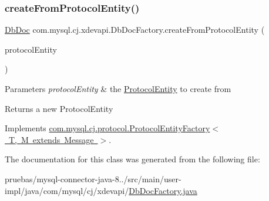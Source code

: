 \subsubsection{\texorpdfstring{create\+From\+Protocol\+Entity()}{createFromProtocolEntity()}}
{\footnotesize\ttfamily \mbox{\hyperlink{interfacecom_1_1mysql_1_1cj_1_1xdevapi_1_1_db_doc}{Db\+Doc}} com.\+mysql.\+cj.\+xdevapi.\+Db\+Doc\+Factory.\+create\+From\+Protocol\+Entity (\begin{DoxyParamCaption}\item[{\mbox{\hyperlink{interfacecom_1_1mysql_1_1cj_1_1protocol_1_1_protocol_entity}{Protocol\+Entity}}}]{protocol\+Entity }\end{DoxyParamCaption})}


\begin{DoxyParams}{Parameters}
{\em protocol\+Entity} & the \mbox{\hyperlink{}{Protocol\+Entity}} to create from \\
\hline
\end{DoxyParams}
\begin{DoxyReturn}{Returns}
a new Protocol\+Entity 
\end{DoxyReturn}


Implements \mbox{\hyperlink{interfacecom_1_1mysql_1_1cj_1_1protocol_1_1_protocol_entity_factory_a282b14fecc86c7202cd9361333235ef8}{com.\+mysql.\+cj.\+protocol.\+Protocol\+Entity\+Factory$<$ T, M extends Message $>$}}.



The documentation for this class was generated from the following file\+:\begin{DoxyCompactItemize}
\item 
pruebas/mysql-\/connector-\/java-\/8../src/main/user-\/impl/java/com/mysql/cj/xdevapi/\mbox{\hyperlink{_db_doc_factory_8java}{Db\+Doc\+Factory.\+java}}\end{DoxyCompactItemize}
